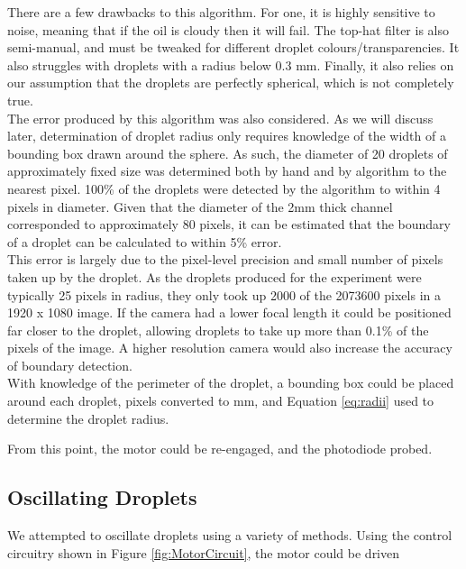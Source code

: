 \documentclass{physics_article_B}
\begin{document}
            There are a few drawbacks to this algorithm. For one, it is highly sensitive to noise, meaning that if the oil is cloudy then it will fail. The top-hat filter is also semi-manual, and must be tweaked for different droplet colours/transparencies. It also struggles with droplets with a radius below 0.3 mm. Finally, it also relies on our assumption that the droplets are perfectly spherical, which is not completely true.\\
            
            The error produced by this algorithm was also considered. As we will discuss later, determination of droplet radius only requires knowledge of the width of a bounding box drawn around the sphere. As such, the diameter of 20 droplets of approximately fixed size was determined both by hand and by algorithm to the nearest pixel. 100\% of the droplets were detected by the algorithm to within 4 pixels in diameter. Given that the diameter of the 2mm thick channel corresponded to approximately 80 pixels, it can be estimated that the boundary of a droplet can be calculated to within 5\% error. \\
            
            This error is largely due to the pixel-level precision and small number of pixels taken up by the droplet. As the droplets produced for the experiment were typically 25 pixels in radius, they only took up 2000 of the 2073600 pixels in a 1920 x 1080 image. If the camera had a lower focal length it could be positioned far closer to the droplet, allowing droplets to take up more than 0.1\% of the pixels of the image. A higher resolution camera would also increase the accuracy of boundary detection. \\
            
            With knowledge of the perimeter of the droplet, a bounding box could be placed around each droplet, pixels converted to mm, and Equation \ref{eq:radii} used to determine the droplet radius.
            
            From this point, the motor could be re-engaged, and the photodiode probed.
    
    \subsection{Oscillating Droplets}
        
        We attempted to oscillate droplets using a variety of methods. Using the control circuitry shown in Figure \ref{fig:MotorCircuit}, the motor could be driven
        
\end{document}
